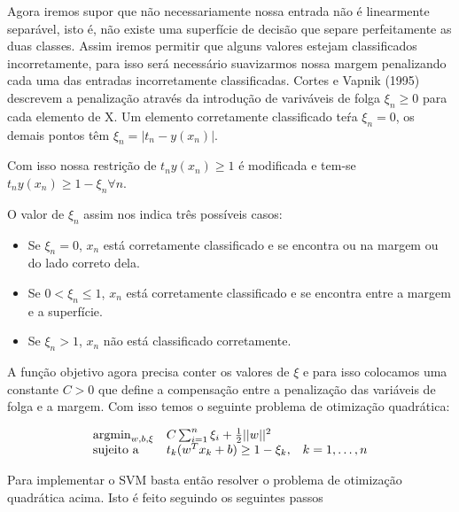 Agora iremos supor que não necessariamente nossa entrada não é linearmente separável, 
isto é, não existe uma superfície de decisão que separe perfeitamente as duas classes. Assim
iremos permitir que alguns valores estejam classificados incorretamente, para isso
será necessário suavizarmos nossa margem penalizando cada uma das entradas incorretamente
classificadas. Cortes e Vapnik (1995)\cite{cortesVapnik1995} descrevem a penalização
através da introdução de variváveis de folga $\xi_n \ge 0$ para cada elemento de X.
Um elemento corretamente classificado teŕa $\xi_n = 0$, os demais pontos têm
 $\xi_n = |t_n - y(x_n)|$.
 
Com isso nossa restrição de $t_ny(x_n) \ge 1$ é modificada e tem-se 
$t_ny(x_n) \ge 1 - \xi_n \forall n$.

O valor de $\xi_n$ assim nos indica três possíveis casos:

\begin{itemize}
	\item Se $\xi_n = 0$, $x_n$ está corretamente classificado e se encontra
	ou na margem ou do lado correto dela.
	\item Se $0 < \xi_n \le 1$, $x_n$ está corretamente classificado e se encontra
	entre a margem e a superfície.
	\item Se $\xi_n > 1$, $x_n$ não está classificado corretamente.
\end{itemize}

A função objetivo agora precisa conter os valores de $\xi$ e para isso colocamos
uma constante $C > 0$ que define a compensação entre a penalização das variáveis de
folga e a margem. Com isso temos o seguinte problema de otimização quadrática:

\begin{center}
	\begin{equation}
		\begin{array}{ll@{}ll}
			\argmin_{w, b, \xi} & C\sum_{i = 1}^n\xi_i + \frac{1}{2}||w||^2 &\\
			\text{sujeito a}& t_k(w^Tx_k + b) \ge 1 - \xi_k, && k = 1, \ldots, n
		\end{array}
	\end{equation}
\end{center}

Para implementar o SVM basta então resolver o problema de otimização quadrática
acima. Isto é feito seguindo os seguintes passos

